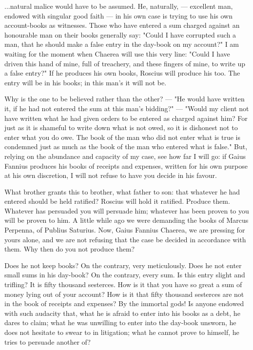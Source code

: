 
 ...natural malice would have to be assumed. He, naturally, --- excellent man, endowed with singular good faith --- in his own case is trying to use his own account-books as witnesses. Those who have entered a sum charged against an honourable man on their books generally say: "Could I have corrupted such a man, that he should make a false entry in the day-book on my account?" I am waiting for the moment when Chaerea will use this very line: "Could I have driven this hand of mine, full of treachery, and these fingers of mine, to write up a false entry?" If he produces his own books, Roscius will produce his too. The entry will be in his books; in this man's it will not be.

 Why is the one to be believed rather than the other? --- "He would have written it, if he had not entered the sum at this man's bidding?" --- "Would my client not have written what he had given orders to be entered as charged against him? For just as it is shameful to write down what is not owed, so it is dishonest not to enter what you do owe. The book of the man who did not enter what is true is condemned just as much as the book of the man who entered what is false." But, relying on the abundance and capacity of my case, see how far I will go: if Gaius Fannius produces his books of receipts and expenses, written for his own purpose at his own discretion, I will not refuse to have you decide in his favour.

 What brother grants this to brother, what father to son: that whatever he had entered should be held ratified? Roscius will hold it ratified. Produce them. Whatever has persuaded you will persuade him; whatever has been proven to you will be proven to him. A little while ago we were demanding the books of Marcus Perpenna, of Publius Saturius. Now, Gaius Fannius Chaerea, we are pressing for yours alone, and we are not refusing that the case be decided in accordance with them. Why then do you not produce them?

 Does he not keep books? On the contrary, very meticulously. Does he not enter small sums in his day-book? On the contrary, every sum. Is this entry slight and trifling? It is fifty thousand sesterces. How is it that you have so great a sum of money lying out of your account? How is it that fifty thousand sesterces are not in the book of receipts and expenses? By the immortal gods! Is anyone endowed with such audacity that, what he is afraid to enter into his books as a debt, he dares to claim; what he was unwilling to enter into the day-book unsworn, he does not hesitate to swear to in litigation; what he cannot prove to himself, he tries to persuade another of?

